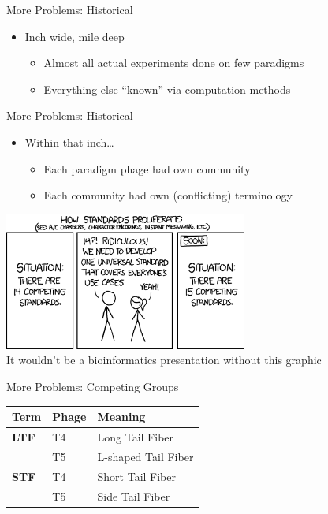 \documentclass[12pt]{beamer}
\begin{document}
\begin{frame}{More Problems: Historical}
    \begin{itemize}
        \item Inch wide, mile deep
        \begin{itemize}
            \item Almost all actual experiments done on few paradigms
            \item Everything else ``known'' via computation methods
        \end{itemize}
    \end{itemize}
\end{frame}

\begin{frame}{More Problems: Historical}
    \begin{itemize}
        \item Within that inch\ldots
        \begin{itemize}
            \item Each paradigm phage had own community
            \item Each community had own (conflicting) terminology
        \end{itemize}
    \end{itemize}
    \centering
    \includegraphics[width=0.6\textwidth]{./standards.png}\\
    \fontsize{6pt}{7.2}\selectfont
    \color{gray}It wouldn't be a bioinformatics presentation without this graphic
\end{frame}

\begin{frame}{More Problems: Competing Groups}
    \begin{table}
        \begin{tabular}{lll}
            Term         & Phage & Meaning\\\hline
            \textbf{LTF} & T4    & Long Tail Fiber\\
                         & T5    & L-shaped Tail Fiber\\
            \textbf{STF} & T4    & Short Tail Fiber \\
                         & T5    & Side Tail Fiber\\
        \end{tabular}
    \end{table}
\end{frame}
\end{document}
